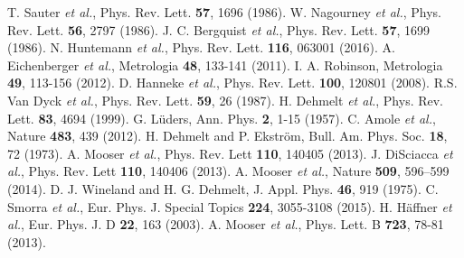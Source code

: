 \documentclass[preprint%
]{elsarticle}
\begin{document}
\begin{thebibliography}{}

 T. Sauter \textit{et al.}, Phys. Rev. Lett. \textbf{57}, 1696 (1986).
 W. Nagourney \textit{et al.}, Phys. Rev. Lett. \textbf{56}, 2797 (1986).
 J. C. Bergquist \textit{et al.}, Phys. Rev. Lett. \textbf{57}, 1699 (1986).
 N. Huntemann \textit{et al.}, Phys. Rev. Lett. \textbf{116}, 063001 (2016).
 A. Eichenberger \textit{et al.}, Metrologia \textbf{48}, 133-141 (2011).
 I. A. Robinson, Metrologia \textbf{49}, 113-156 (2012).
 D. Hanneke \textit{et al.}, Phys. Rev. Lett. \textbf{100}, 120801 (2008).
 R.S. Van Dyck \textit{et al.}, Phys. Rev. Lett. \textbf{59}, 26 (1987).
 H. Dehmelt \textit{et al.}, Phys. Rev. Lett. \textbf{83}, 4694 (1999).
 G. L\"uders, Ann. Phys. \textbf{2}, 1-15 (1957).
 C. Amole \textit{et al.}, Nature \textbf{483}, 439 (2012).
 H. Dehmelt and P. Ekstr\"om, Bull. Am. Phys. Soc. \textbf{18}, 72 (1973).
 A. Mooser \textit{et al.}, Phys. Rev. Lett \textbf{110}, 140405 (2013).
 J. DiSciacca \textit{et al.}, Phys. Rev. Lett \textbf{110}, 140406 (2013).
 A. Mooser \textit{et al.}, Nature \textbf{509}, 596–599 (2014).
 D. J. Wineland and H. G. Dehmelt, J. Appl. Phys. \textbf{46}, 919 (1975).
 C. Smorra \textit{et al.}, Eur. Phys. J. Special Topics \textbf{224}, 3055-3108 (2015).
 H. H\"affner \textit{et al.}, Eur. Phys. J. D \textbf{22}, 163 (2003).
 A. Mooser \textit{et al.}, Phys. Lett. B \textbf{723}, 78-81 (2013).


\end{thebibliography}
\end{document}
